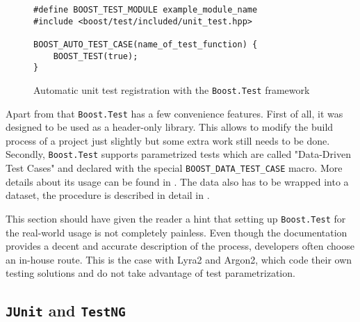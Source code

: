 \begin{figure}
\centering
\begin{verbatim}
#define BOOST_TEST_MODULE example_module_name
#include <boost/test/included/unit_test.hpp>

BOOST_AUTO_TEST_CASE(name_of_test_function) {
    BOOST_TEST(true);
}
  \end{verbatim}
  \caption{Automatic unit test registration with the \texttt{Boost.Test} framework}
  \label{figure:boost-auto-test-case}
  \end{figure}

Apart from that \texttt{Boost.Test} has a few convenience features. First of all, it was designed to be used as a header-only library. This allows to modify the build process of a project just slightly but some extra work still needs to be done. Secondly, \texttt{Boost.Test} supports parametrized tests which are called "Data-Driven Test Cases" and declared with the special \texttt{BOOST_DATA_TEST_CASE} macro. More details about its usage can be found in \cite{boost:2017:test-docs-data-macro}. The data also has to be wrapped into a dataset, the procedure is described in detail in \cite{boost:2017:test-docs-dataset}.

This section should have given the reader a hint that setting up \texttt{Boost.Test} for the real-world usage is not completely painless. Even though the documentation provides a decent and accurate description of the process, developers often choose an in-house route. This is the case with Lyra2 and Argon2, which code their own testing solutions and do not take advantage of test parametrization.

\subsection{\texttt{JUnit} and \texttt{TestNG}}
\label{sec:unit-junit-testng}

